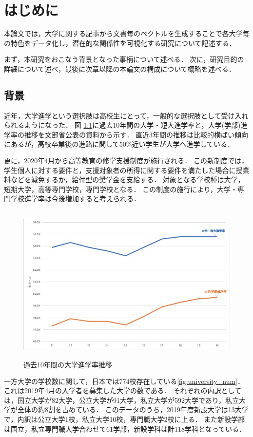 \chapter{はじめに}
本論文では，大学に関する記事から文書毎のベクトルを生成することで各大学毎の特色をデータ化し，潜在的な関係性を可視化する研究について記述する．

まず，本研究をおこなう背景となった事柄について述べる．
次に，研究目的の詳細について述べ，最後に次章以降の本論文の構成について概略を述べる．

\section{背景}
近年，大学進学という選択肢は高校生にとって，一般的な選択肢として受け入れられるようになった．
図 \ref{fig:univ_continuance_rate}に過去10年間の大学・短大進学率と，大学(学部)進学率の推移を文部省公表\cite{univContinuanceRate}の資料から示す．  
直近3年間の推移は比較的横ばい傾向にあるが，高校卒業後の進路に関して50\%近い学生が大学へ進学している．

更に，2020年4月から高等教育の修学支援制度\cite{Shingakusyusienseido}が施行される．
この新制度では，学生個人に対する要件と，支援対象者の所得に関する要件を満たした場合に授業料などを減免するか，給付型の奨学金を支給する．
対象となる学校種は大学，短期大学，高等専門学校，専門学校となる．
この制度の施行により，大学・専門学校進学率は今後増加すると考えられる．  
\begin{figure}[H]
\centering
\includegraphics[height=8cm]{images/univ_continuance_rate.jpg}
\caption{過去10年間の大学進学率推移}
\label{fig:univ_continuance_rate}
\end{figure}

一方大学の学校数に関して，日本では774校存在している\ref{fig:university_num}．これは2019年4月の入学者を募集した大学の数である．
それぞれの内訳としては，国立大学が82大学，公立大学が91大学，私立大学が592大学であり，私立大学が全体の約8割を占めている．
このデータのうち，2019年度新設大学は13大学で，内訳は公立大学1校，私立大学10校，専門職大学2校に上る．
また新設学部は国立，私立専門職大学合わせて61学部，新設学科は計118学科となっている．

